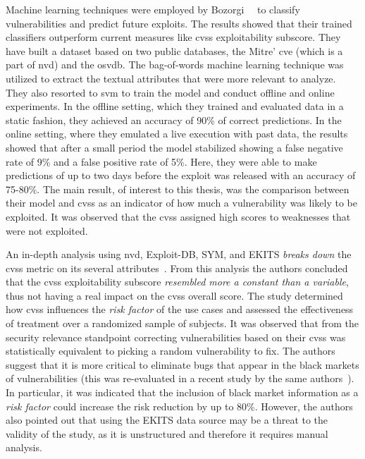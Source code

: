 Machine learning techniques were employed by Bozorgi~\etal{}~\cite{Bozorgi:2010} to classify vulnerabilities and predict future exploits.
The results showed that their trained classifiers outperform current measures like \gls{cvss} exploitability subscore.
They have built a dataset based on two public databases, the Mitre' \gls{cve} (which is a part of \gls{nvd}) and the \gls{osvdb}.
The bag-of-words machine learning technique was utilized to extract the textual attributes that were more relevant to analyze.
They also resorted to \gls{svm} to train the model and conduct offline and online experiments.
In the offline setting, which they trained and evaluated data in a static fashion, they achieved an accuracy of 90\% of correct predictions.
In the online setting, where they emulated a live execution with past data, the results showed that after a small period the model stabilized showing a false negative rate of 9\% and a false positive rate
of 5\%.
Here, they were able to make predictions of up to two days before the exploit was released with an accuracy of 75-80\%.
The main result, of interest to this thesis, was the comparison between their model and \gls{cvss} as an indicator of how much a vulnerability was likely to be exploited.
It was observed that the \gls{cvss} assigned high scores to weaknesses that were not exploited. 


An in-depth analysis using \gls{nvd}, Exploit-DB, SYM, and EKITS \emph{breaks down} the \gls{cvss} metric on its several attributes~\cite{Allodi:2014}.
From this analysis the authors concluded that the \gls{cvss} exploitability subscore \emph{resembled more a constant than a variable}, thus not having a real impact on the \gls{cvss} overall score.
The study determined how \gls{cvss} influences the \emph{risk factor} of the use cases and assessed the effectiveness of treatment over a randomized sample of subjects.
It was observed that from the security relevance standpoint correcting vulnerabilities based on their \gls{cvss} was statistically equivalent to picking a random vulnerability to fix.
The authors suggest that it is more critical to eliminate bugs that appear in the black markets of vulnerabilities (this was re-evaluated in a recent study by the same authors~\cite{Allodi:2017}).
In particular, it was indicated that the inclusion of black market information as a \emph{risk factor} could increase the risk reduction by up to 80\%.
However, the authors also pointed out that using the EKITS data source may be a threat to the validity of the study, as it is unstructured and therefore it requires manual analysis.



